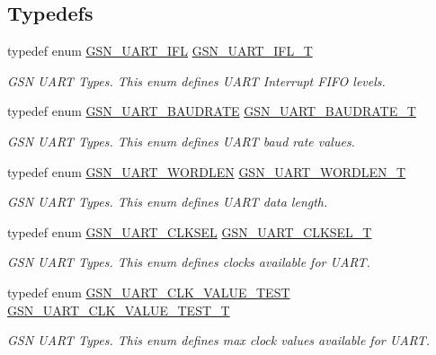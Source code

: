 \subsection*{Typedefs}
\begin{DoxyCompactItemize}
\item 
typedef enum \hyperlink{a00656_gaca485e5a863be5b5c698317dc0ca469a}{GSN\_\-UART\_\-IFL} \hyperlink{a00656_ga170d0f1af6abfe39aa2dc0586412a85c}{GSN\_\-UART\_\-IFL\_\-T}
\begin{DoxyCompactList}\small\item\em GSN UART Types. This enum defines UART Interrupt FIFO levels. \end{DoxyCompactList}\item 
typedef enum \hyperlink{a00656_ga99b0d3d670ac3d61d3a8764fafc3b992}{GSN\_\-UART\_\-BAUDRATE} \hyperlink{a00656_ga867d009d402b5b0186abe5307715b9fc}{GSN\_\-UART\_\-BAUDRATE\_\-T}
\begin{DoxyCompactList}\small\item\em GSN UART Types. This enum defines UART baud rate values. \end{DoxyCompactList}\item 
typedef enum \hyperlink{a00656_ga9082153fb94765f4ce91b584f1d8a0a3}{GSN\_\-UART\_\-WORDLEN} \hyperlink{a00656_gac850885034c791e458a2edf4a0530f67}{GSN\_\-UART\_\-WORDLEN\_\-T}
\begin{DoxyCompactList}\small\item\em GSN UART Types. This enum defines UART data length. \end{DoxyCompactList}\item 
typedef enum \hyperlink{a00656_gad03ef3aa80077ad749fb3afd6e9a23af}{GSN\_\-UART\_\-CLKSEL} \hyperlink{a00656_ga615bd92bf0cbe48e5b0502e97a57b0a5}{GSN\_\-UART\_\-CLKSEL\_\-T}
\begin{DoxyCompactList}\small\item\em GSN UART Types. This enum defines clocks available for UART. \end{DoxyCompactList}\item 
typedef enum \hyperlink{a00656_ga89a87c4e15500db4330f0d501e2068d1}{GSN\_\-UART\_\-CLK\_\-VALUE\_\-TEST} \hyperlink{a00656_ga52bf28199735274775228339e8d05012}{GSN\_\-UART\_\-CLK\_\-VALUE\_\-TEST\_\-T}
\begin{DoxyCompactList}\small\item\em GSN UART Types. This enum defines max clock values available for UART. \end{DoxyCompactList}\item 

\end{DoxyCompactItemize}
